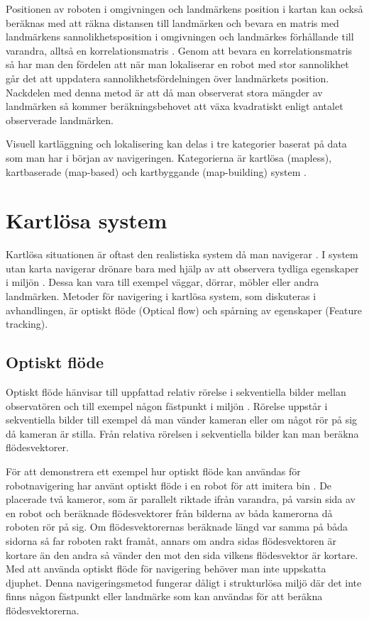 Positionen av roboten i omgivningen och landmärkens position i kartan kan också beräknas med att räkna distansen till landmärken och bevara en matris med landmärkens sannolikhetsposition i omgivningen och landmärkes förhållande till varandra, alltså en korrelationsmatris \citep{realslamproblem, ProbabilisticRobotics}. Genom att bevara en korrelationsmatris så har man den fördelen att när man lokaliserar en robot med stor sannolikhet går det att uppdatera sannolikhetsfördelningen över landmärkets position. Nackdelen med denna metod är att då man observerat stora mängder av landmärken så kommer beräkningsbehovet att växa kvadratiskt enligt antalet observerade landmärken. 

Visuell kartläggning och lokalisering kan delas i tre kategorier baserat på data som man har i början av navigeringen. Kategorierna är kartlösa (mapless), kartbaserade (map-based) och kartbyggande (map-building) system \citep{geospatial}. 

\section{Kartlösa system}

Kartlösa situationen är oftast den realistiska system då man navigerar \citep{ProbabilisticRobotics}. I system utan karta navigerar drönare bara med hjälp av att observera tydliga egenskaper i miljön \citep{982903}. Dessa kan vara till exempel väggar, dörrar, möbler eller andra landmärken. Metoder för navigering i kartlösa system, som diskuteras i avhandlingen, är optiskt flöde (Optical flow) och spårning av egenskaper (Feature tracking). 

\subsection{Optiskt flöde}

Optiskt flöde hänvisar till uppfattad relativ rörelse i sekventiella bilder mellan observatören och till exempel någon fästpunkt i miljön \citep{opticalflowuav}. Rörelse uppstår i sekventiella bilder till exempel då man vänder kameran eller om något rör på sig då kameran är stilla. Från relativa rörelsen i sekventiella bilder kan man beräkna flödesvektorer.

För att demonstrera ett exempel hur optiskt flöde kan användas för robotnavigering har \cite{341094} använt optiskt flöde i en robot för att imitera bin \citep{341094}. De placerade två kameror, som är parallelt riktade ifrån varandra, på varsin sida av en robot och beräknade flödesvektorer från bilderna av båda kamerorna då roboten rör på sig. Om flödesvektorernas beräknade längd var samma på båda sidorna så far roboten rakt framåt, annars om andra sidas flödesvektoren är kortare än den andra så vänder den mot den sida vilkens flödesvektor är kortare. Med att använda optiskt flöde för navigering behöver man inte uppskatta djuphet. Denna navigeringsmetod fungerar dåligt i strukturlösa miljö där det inte finns någon fästpunkt eller landmärke som kan användas för att beräkna flödesvektorerna. 

